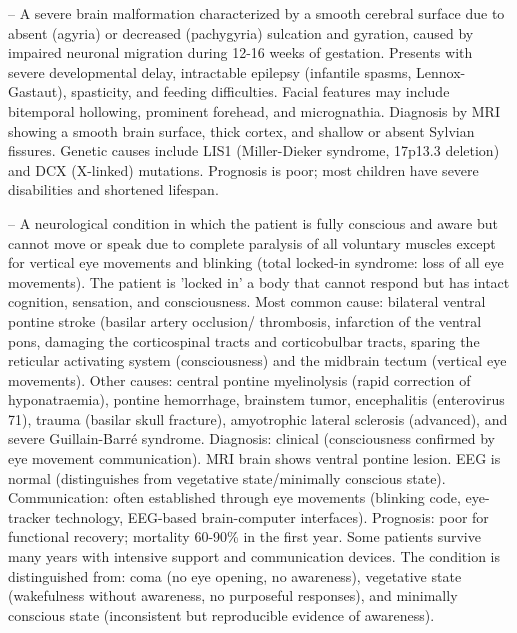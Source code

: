 -- A severe brain malformation characterized by a smooth cerebral surface due to absent (agyria) or decreased (pachygyria) sulcation and gyration, caused by impaired neuronal migration during 12-16 weeks of gestation. Presents with severe developmental delay, intractable epilepsy (infantile spasms, Lennox-Gastaut), spasticity, and feeding difficulties. Facial features may include bitemporal hollowing, prominent forehead, and micrognathia. Diagnosis by MRI showing a smooth brain surface, thick cortex, and shallow or absent Sylvian fissures. Genetic causes include LIS1 (Miller-Dieker syndrome, 17p13.3 deletion) and DCX (X-linked) mutations. Prognosis is poor; most children have severe disabilities and shortened lifespan.

-- A neurological condition in which the patient is fully conscious and aware but cannot move or speak due to complete paralysis of all voluntary muscles except for vertical eye movements and blinking (total locked-in syndrome: loss of all eye movements). The patient is 'locked in' a body that cannot respond but has intact cognition, sensation, and consciousness. Most common cause: bilateral ventral pontine stroke (basilar artery occlusion/ thrombosis, infarction of the ventral pons, damaging the corticospinal tracts and corticobulbar tracts, sparing the reticular activating system (consciousness) and the midbrain tectum (vertical eye movements). Other causes: central pontine myelinolysis (rapid correction of hyponatraemia), pontine hemorrhage, brainstem tumor, encephalitis (enterovirus 71), trauma (basilar skull fracture), amyotrophic lateral sclerosis (advanced), and severe Guillain-Barré syndrome. Diagnosis: clinical (consciousness confirmed by eye movement communication). MRI brain shows ventral pontine lesion. EEG is normal (distinguishes from vegetative state/minimally conscious state). Communication: often established through eye movements (blinking code, eye-tracker technology, EEG-based brain-computer interfaces). Prognosis: poor for functional recovery; mortality 60-90\% in the first year. Some patients survive many years with intensive support and communication devices. The condition is distinguished from: coma (no eye opening, no awareness), vegetative state (wakefulness without awareness, no purposeful responses), and minimally conscious state (inconsistent but reproducible evidence of awareness).

